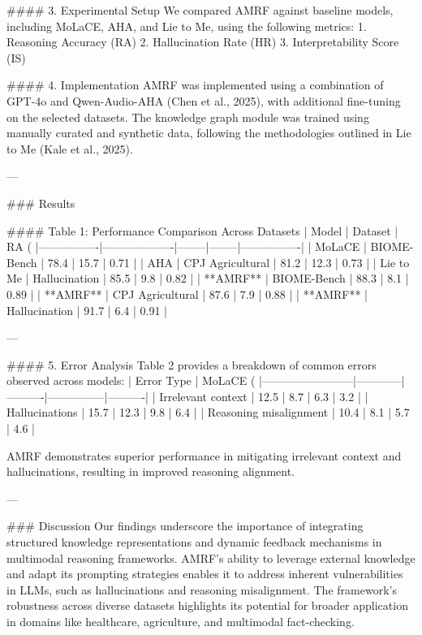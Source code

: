 #### 3. Experimental Setup  
We compared AMRF against baseline models, including MoLaCE, AHA, and Lie to Me, using the following metrics:  
1. Reasoning Accuracy (RA)  
2. Hallucination Rate (HR)  
3. Interpretability Score (IS)  

#### 4. Implementation  
AMRF was implemented using a combination of GPT-4o and Qwen-Audio-AHA (Chen et al., 2025), with additional fine-tuning on the selected datasets. The knowledge graph module was trained using manually curated and synthetic data, following the methodologies outlined in Lie to Me (Kale et al., 2025).  

---

### Results  

#### Table 1: Performance Comparison Across Datasets  
| Model          | Dataset           | RA (%
|----------------|-------------------|--------|--------|----------------|  
| MoLaCE         | BIOME-Bench       | 78.4   | 15.7   | 0.71           |  
| AHA            | CPJ Agricultural  | 81.2   | 12.3   | 0.73           |  
| Lie to Me      | Hallucination     | 85.5   | 9.8    | 0.82           |  
| **AMRF**       | BIOME-Bench       | 88.3   | 8.1    | 0.89           |  
| **AMRF**       | CPJ Agricultural  | 87.6   | 7.9    | 0.88           |  
| **AMRF**       | Hallucination     | 91.7   | 6.4    | 0.91           |  

---

#### 5. Error Analysis  
Table 2 provides a breakdown of common errors observed across models:  
| Error Type             | MoLaCE (%
|------------------------|------------|----------|---------------|----------|  
| Irrelevant context     | 12.5       | 8.7      | 6.3           | 3.2      |  
| Hallucinations         | 15.7       | 12.3     | 9.8           | 6.4      |  
| Reasoning misalignment | 10.4       | 8.1      | 5.7           | 4.6      |  

AMRF demonstrates superior performance in mitigating irrelevant context and hallucinations, resulting in improved reasoning alignment.

---

### Discussion  
Our findings underscore the importance of integrating structured knowledge representations and dynamic feedback mechanisms in multimodal reasoning frameworks. AMRF's ability to leverage external knowledge and adapt its prompting strategies enables it to address inherent vulnerabilities in LLMs, such as hallucinations and reasoning misalignment. The framework's robustness across diverse datasets highlights its potential for broader application in domains like healthcare, agriculture, and multimodal fact-checking.  

